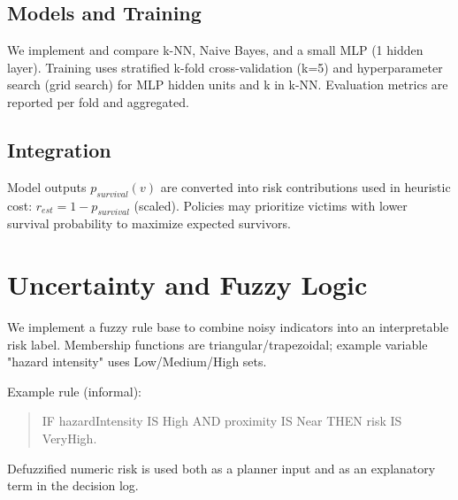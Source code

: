 \documentclass[conference]{IEEEtran}
\begin{document}

  \subsection{Models and Training}
  We implement and compare k-NN, Naive Bayes, and a small MLP (1 hidden layer).
  Training uses stratified k-fold cross-validation (k=5) and hyperparameter
  search (grid search) for MLP hidden units and k in k-NN. Evaluation metrics are
  reported per fold and aggregated.

  \subsection{Integration}
  Model outputs $p_{survival}(v)$ are converted into risk contributions used in
  heuristic cost: $r_{est} = 1 - p_{survival}$ (scaled). Policies may prioritize
  victims with lower survival probability to maximize expected survivors.

  \section{Uncertainty and Fuzzy Logic}
  We implement a fuzzy rule base to combine noisy indicators into an interpretable
  risk label. Membership functions are triangular/trapezoidal; example variable
  "hazard intensity" uses Low/Medium/High sets.

  Example rule (informal):
  \begin{quote}
  IF hazardIntensity IS High AND proximity IS Near THEN risk IS VeryHigh.
  \end{quote}

  Defuzzified numeric risk is used both as a planner input and as an explanatory
  term in the decision log.


\end{document}
\end{itemize}
\end{document}
